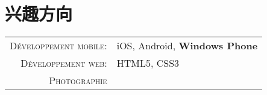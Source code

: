 \section{\texorpdfstring{\color{Blue}兴趣方向}{兴趣方向}}
\begin{tabular}{rl}
    \textsc{Développement mobile:} & iOS, Android, \textbf{Windows Phone}\\
    \textsc{Développement web:} & HTML5, CSS3 \\ 
    \textsc{Photographie} & \\
\end{tabular}
